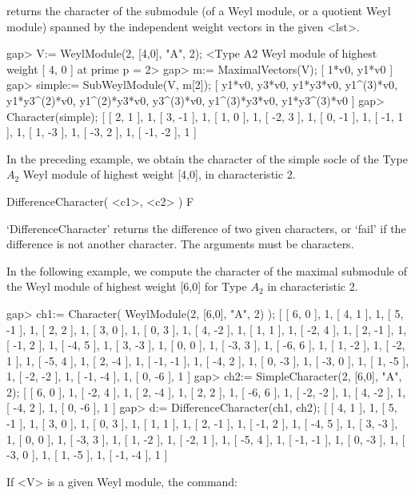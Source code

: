 returns the character of the submodule (of a Weyl module, or a
quotient Weyl module) spanned by the independent weight vectors in
the given <lst>.

\beginexample
gap> V:= WeylModule(2, [4,0], "A", 2);
<Type A2 Weyl module of highest weight [ 4, 0 ] at prime p = 2>
gap> m:= MaximalVectors(V);
[ 1*v0, y1*v0 ]
gap> simple:= SubWeylModule(V, m[2]);
[ y1*v0, y3*v0, y1*y3*v0, y1^(3)*v0, y1*y3^(2)*v0, y1^(2)*y3*v0, y3^(3)*v0, 
  y1^(3)*y3*v0, y1*y3^(3)*v0 ]
gap> Character(simple);
[ [ 2, 1 ], 1, [ 3, -1 ], 1, [ 1, 0 ], 1, [ -2, 3 ], 1, [ 0, -1 ], 1, 
  [ -1, 1 ], 1, [ 1, -3 ], 1, [ -3, 2 ], 1, [ -1, -2 ], 1 ]
\endexample

In the preceding example, we obtain the character of the simple socle
of the Type $A_2$ Weyl module of highest weight [4,0], in
characteristic 2.


\>DifferenceCharacter( <c1>, <c2> ) F

`DifferenceCharacter' returns the difference of two given characters,
or `fail' if the difference is not another character. The arguments
must be characters.

In the following example, we compute the character of the maximal
submodule of the Weyl module of highest weight [6,0] for Type $A_2$ in
characteristic 2.

\beginexample
gap> ch1:= Character( WeylModule(2, [6,0], "A", 2) ); 
[ [ 6, 0 ], 1, [ 4, 1 ], 1, [ 5, -1 ], 1, [ 2, 2 ], 1, [ 3, 0 ], 1, [ 0, 3 ], 
  1, [ 4, -2 ], 1, [ 1, 1 ], 1, [ -2, 4 ], 1, [ 2, -1 ], 1, [ -1, 2 ], 1, 
  [ -4, 5 ], 1, [ 3, -3 ], 1, [ 0, 0 ], 1, [ -3, 3 ], 1, [ -6, 6 ], 1, 
  [ 1, -2 ], 1, [ -2, 1 ], 1, [ -5, 4 ], 1, [ 2, -4 ], 1, [ -1, -1 ], 1, 
  [ -4, 2 ], 1, [ 0, -3 ], 1, [ -3, 0 ], 1, [ 1, -5 ], 1, [ -2, -2 ], 1, 
  [ -1, -4 ], 1, [ 0, -6 ], 1 ]
gap> ch2:= SimpleCharacter(2, [6,0], "A", 2);        
[ [ 6, 0 ], 1, [ -2, 4 ], 1, [ 2, -4 ], 1, [ 2, 2 ], 1, [ -6, 6 ], 1, 
  [ -2, -2 ], 1, [ 4, -2 ], 1, [ -4, 2 ], 1, [ 0, -6 ], 1 ]
gap> d:= DifferenceCharacter(ch1, ch2);              
[ [ 4, 1 ], 1, [ 5, -1 ], 1, [ 3, 0 ], 1, [ 0, 3 ], 1, [ 1, 1 ], 1, 
  [ 2, -1 ], 1, [ -1, 2 ], 1, [ -4, 5 ], 1, [ 3, -3 ], 1, [ 0, 0 ], 1, 
  [ -3, 3 ], 1, [ 1, -2 ], 1, [ -2, 1 ], 1, [ -5, 4 ], 1, [ -1, -1 ], 1, 
  [ 0, -3 ], 1, [ -3, 0 ], 1, [ 1, -5 ], 1, [ -1, -4 ], 1 ]
\endexample



If <V> is a given Weyl module, the command:

